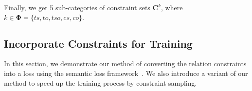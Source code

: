 

Finally, we get 5 sub-categories of constraint sets $\bm{C}^{k}$, where $k\in\bm{\Phi}=\{ts, to, tso, cs, co\}$.

\subsection{Incorporate  Constraints for Training}
\label{sec:loss_term}
In this section, we demonstrate our method of converting the relation constraints into a loss using the semantic loss framework~\cite{xu2017semantic}.
We also introduce a variant of our method to speed up the training process by constraint sampling.

